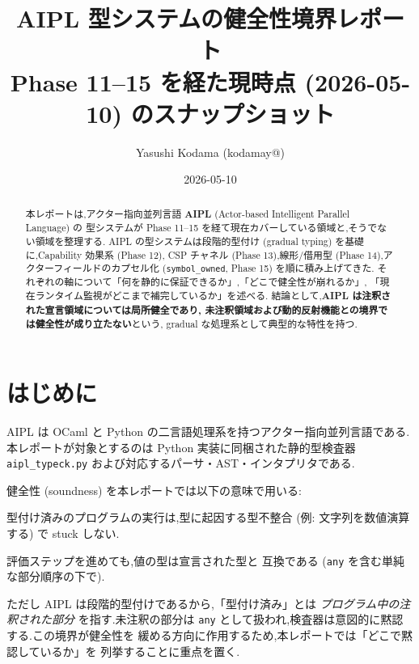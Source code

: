 \documentclass[11pt,a4paper]{article}
\title{\bfseries AIPL 型システムの健全性境界レポート \\
       \large Phase 11--15 を経た現時点 (2026-05-10) のスナップショット}
\author{Yasushi Kodama (kodamay@)}
\date{2026-05-10}
\newcommand{\code}[1]{\texttt{\small #1}}
\begin{document}
\maketitle

\begin{abstract}
本レポートは,アクター指向並列言語 \textbf{AIPL} (Actor-based Intelligent Parallel Language) の
型システムが Phase 11--15 を経て現在カバーしている領域と,そうでない領域を整理する.
AIPL の型システムは段階的型付け (gradual typing) を基礎に,Capability 効果系 (Phase 12),
CSP チャネル (Phase 13),線形/借用型 (Phase 14),アクターフィールドのカプセル化
(\code{symbol\_owned}, Phase 15) を順に積み上げてきた.
それぞれの軸について「何を静的に保証できるか」,「どこで健全性が崩れるか」,
「現在ランタイム監視がどこまで補完しているか」を述べる.
結論として,\textbf{AIPL は注釈された宣言領域については局所健全であり,
未注釈領域および動的反射機能との境界では健全性が成り立たない}という,
gradual な処理系として典型的な特性を持つ.
\end{abstract}

\tableofcontents
\bigskip

\section{はじめに}
\label{sec:intro}

AIPL は OCaml と Python の二言語処理系を持つアクター指向並列言語である.
本レポートが対象とするのは Python 実装に同梱された静的型検査器
\code{aipl\_typeck.py} および対応するパーサ・AST・インタプリタである.

健全性 (soundness) を本レポートでは以下の意味で用いる:

\begin{description}[leftmargin=2em]
  \item[Progress] 型付け済みのプログラムの実行は,型に起因する型不整合
        (例: 文字列を数値演算する) で stuck しない.
  \item[Preservation] 評価ステップを進めても,値の型は宣言された型と
        互換である (\code{any} を含む単純な部分順序の下で).
\end{description}

ただし AIPL は段階的型付けであるから,「型付け済み」とは
\emph{プログラム中の注釈された部分} を指す.未注釈の部分は \code{any}
として扱われ,検査器は意図的に黙認する.この境界が健全性を
緩める方向に作用するため,本レポートでは「どこで黙認しているか」を
列挙することに重点を置く.
\end{document}
